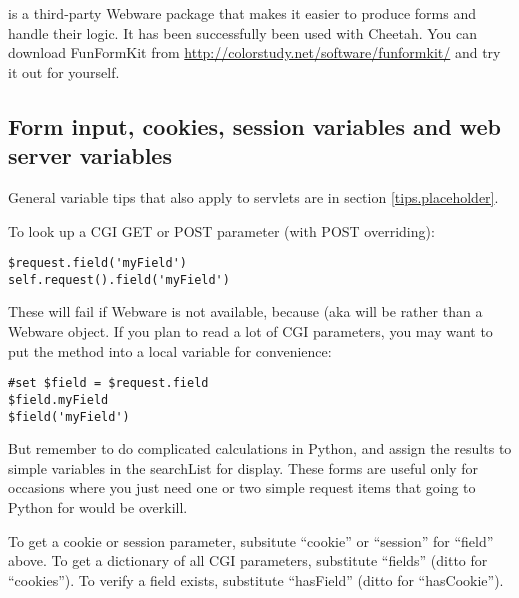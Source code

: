 
 is a third-party Webware package that makes it easier to
produce forms and handle their logic.  It has been successfully been used with
Cheetah.  You can download FunFormKit from
\url{http://colorstudy.net/software/funformkit/} and try it out for yourself.


\subsection{Form input, cookies, session variables and web server variables}
\label{webware.input}

General variable tips that also apply to servlets are in section
\ref{tips.placeholder}.

To look up a CGI GET or POST parameter (with POST overriding):
\begin{verbatim}
$request.field('myField')     
self.request().field('myField')
\end{verbatim}
These will fail if Webware is not available, because 
(aka  will be  rather than a Webware
 object.  If you plan to read a lot of CGI parameters,
you may want to put the  method into a local variable for
convenience:
\begin{verbatim}
#set $field = $request.field
$field.myField
$field('myField')
\end{verbatim}
But remember to do complicated calculations in Python, and assign the results
to simple variables in the searchList for display.  These 
forms are useful only for occasions where you just need one or two simple
request items that going to Python for would be overkill.

To get a cookie or session parameter, subsitute ``cookie'' or ``session'' for
``field'' above.  To get a dictionary of all CGI parameters, substitute
``fields'' (ditto for ``cookies'').  To verify a field exists,
substitute ``hasField'' (ditto for ``hasCookie'').  

